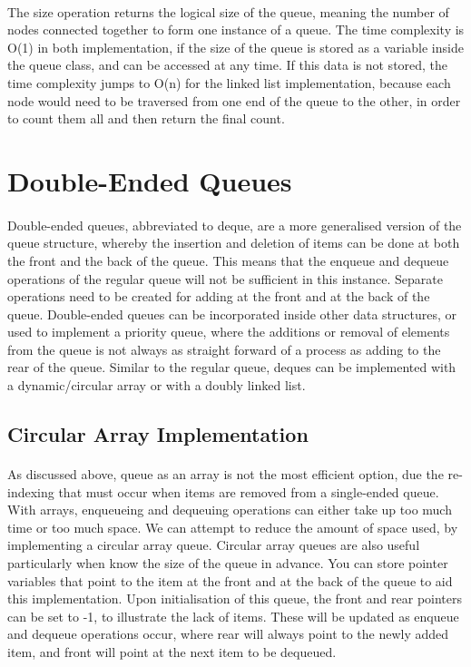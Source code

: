 \documentclass[12pt]{article}
\begin{document}
\paragraph{} The size operation returns the logical size of the queue, meaning the number of nodes connected together to form one instance of a queue. The time complexity is O(1) in both implementation, if the size of the queue is stored as a variable inside the queue class, and can be accessed at any time. If this data is not stored, the time complexity jumps to O(n) for the linked list implementation, because each node would need to be traversed from one end of the queue to the other, in order to count them all and then return the final count.


\section{Double-Ended Queues}

\paragraph{} Double-ended queues, abbreviated to deque, are a more generalised version of the queue structure, whereby the insertion and deletion of items can be done at both the front and the back of the queue. This means that the enqueue and dequeue operations of the regular queue will not be sufficient in this instance. Separate operations need to be created for adding at the front and at the back of the queue. Double-ended queues can be incorporated inside other data structures, or used to implement a priority queue, where the additions or removal of elements from the queue is not always as straight forward of a process as adding to the rear of the queue. Similar to the regular queue, deques can be implemented with a dynamic/circular array or with a doubly linked list.

\subsection{Circular Array Implementation}

\paragraph{} As discussed above, queue as an array is not the most efficient option, due the re-indexing that must occur when items are removed from a single-ended queue. With arrays, enqueueing and dequeuing operations can either take up too much time or too much space. We can attempt to reduce the amount of space used, by implementing a circular array queue. Circular array queues are also useful particularly when know the size of the queue in advance. You can store pointer variables that point to the item at the front and at the back of the queue to aid this implementation. Upon initialisation of this queue, the front and rear pointers can be set to -1, to illustrate the lack of items. These will be updated as enqueue and dequeue operations occur, where rear will always point to the newly added item, and front will point at the next item to be dequeued.
\end{document}
